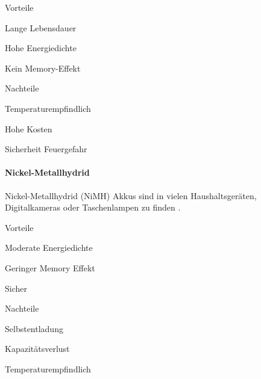\documentclass[../main.tex]{subfiles}
\begin{document}
\begin{minipage}[t]{0.48\textwidth}
\begin{items}
  \item [Vorteile]
  \item Lange Lebensdauer
  \item Hohe Energiedichte
  \item Kein Memory-Effekt
\end{items}
\end{minipage}
\hfill
\begin{minipage}[t]{0.48\textwidth}
\begin{items}
  \item [Nachteile]
  \item Temperaturempfindlich
  \item Hohe Kosten
  \item Sicherheit Feuergefahr
\end{items}
\end{minipage}
 

\paragraph{Nickel-Metallhydrid}

Nickel-Metallhydrid (NiMH) Akkus sind in vielen Haushaltsgeräten, Digitalkameras oder Taschenlampen zu finden \cite{nimh}.

\begin{minipage}[t]{0.48\textwidth}
\begin{items}
  \item [Vorteile]
  \item Moderate Energiedichte
  \item Geringer Memory Effekt
  \item Sicher
\end{items}
\end{minipage}
\hfill
\begin{minipage}[t]{0.48\textwidth}
\begin{items}
  \item [Nachteile]
  \item Selbstentladung
  \item Kapazitätsverlust
  \item Temperaturempfindlich
\end{items}
\end{minipage}
\end{document}
